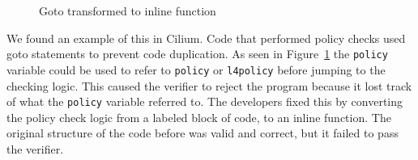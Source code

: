 \begin{figure}
    
    \caption{Goto transformed to inline function}
    \label{fig:inline-fig}
\end{figure}

%
%

We found an example of this in Cilium.
Code that performed policy checks used goto statements to prevent code duplication.
As seen in Figure~\ref{fig:inline-fig} the \texttt{policy} variable could be used to refer to \texttt{policy} or \texttt{l4policy} before jumping to the checking logic.
This caused the verifier to reject the program because it lost track of what the \texttt{policy} variable referred to.
The developers fixed this by converting the policy check logic from a labeled block of code, to an inline function.
The original structure of the code before was valid and correct, but it failed to pass the verifier.


